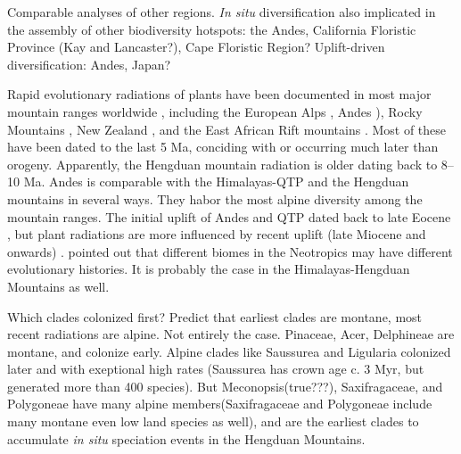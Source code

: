 Comparable analyses of other regions. \textit{In situ} diversification also implicated in the assembly of other biodiversity hotspots: the Andes, California Floristic Province (Kay and Lancaster?), Cape Floristic Region? Uplift-driven diversification: Andes, Japan?

Rapid evolutionary radiations of plants have been documented in most major mountain ranges worldwide \citep[reviewed in][]{HughesC2015}, including the European Alps \citep{Roquet2013}, Andes \citep[e.g.][]{Hughes2006,Luebert2014}), Rocky Mountains \citep{DrummondC2012}, New Zealand \citep{Joly2014}, and the East African Rift mountains \citep{Linder2014}. Most of these have been dated to the last 5 Ma, conciding with or occurring much later than orogeny. Apparently, the Hengduan mountain radiation is older dating back to 8--10 Ma. Andes is comparable with the Himalayas-QTP and the Hengduan mountains in several ways. They habor the most alpine diversity among the mountain ranges. The initial uplift of Andes and QTP dated back to late Eocene \citep{Gregory-Wodzicki2000,Graham2009}, but plant radiations are more influenced by recent uplift (late Miocene and onwards) \citep{Hughes2013,Luebert2014,HughesC2015,Madrinan2013}. \citet{HughesC2013} pointed out that different biomes in the Neotropics may have different evolutionary histories. It is probably the case in the Himalayas-Hengduan Mountains as well. 

Which clades colonized first? Predict that earliest clades are montane, most recent radiations are alpine. Not entirely the case. Pinaceae, Acer, Delphineae are montane, and colonize early. Alpine clades like Saussurea and Ligularia colonized later and with exeptional high rates (Saussurea has crown age c. 3 Myr, but generated more than 400 species). But Meconopsis(true???), Saxifragaceae, and Polygoneae have many alpine members(Saxifragaceae and Polygoneae include many montane even low land species as well), and are the earliest clades to accumulate \textit{in situ} speciation events in the Hengduan Mountains.

